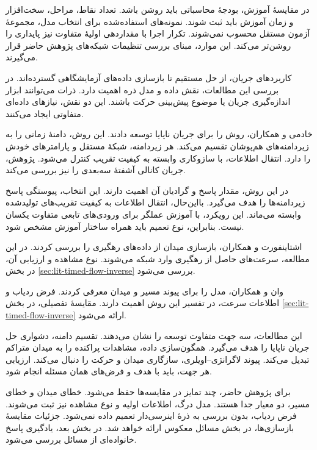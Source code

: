 در مقایسهٔ آموزش، بودجهٔ محاسباتی باید روشن باشد.
تعداد نقاط، مراحل، سخت‌افزار و زمان آموزش باید ثبت شوند.
نمونه‌های استفاده‌شده برای انتخاب مدل، مجموعهٔ آزمون مستقل محسوب نمی‌شوند.
تکرار اجرا با مقداردهی اولیهٔ متفاوت نیز پایداری را روشن‌تر می‌کند.
این موارد، مبنای بررسی تنظیمات شبکه‌های پژوهش حاضر قرار می‌گیرند.

\label{sec:lit-pinn-flow-particle-applications}

کاربردهای جریان، از حل مستقیم تا بازسازی داده‌های آزمایشگاهی گسترده‌اند.
در بررسی این مطالعات، نقش داده و مدل ذره اهمیت دارد.
ذرات می‌توانند ابزار اندازه‌گیری جریان یا موضوع پیش‌بینی حرکت باشند.
این دو نقش، نیازهای داده‌ای متفاوتی ایجاد می‌کنند.

خادمی و همکاران، روش  را برای جریان ناپایا توسعه دادند.
این روش، دامنهٔ زمانی را به زیردامنه‌های هم‌پوشان تقسیم می‌کند.
هر زیردامنه، شبکهٔ مستقل و پارامترهای خودش را دارد.
انتقال اطلاعات، با سازوکاری وابسته به کیفیت تقریب کنترل می‌شود.
پژوهش، جریان کانالی آشفتهٔ سه‌بعدی را نیز بررسی می‌کند.
\cite{Khademi2025}

در این روش، مقدار پاسخ و گرادیان آن اهمیت دارند.
این انتخاب، پیوستگی پاسخ زیردامنه‌ها را هدف می‌گیرد.
بااین‌حال، انتقال اطلاعات به کیفیت تقریب‌های تولیدشده وابسته می‌ماند.
این رویکرد، با آموزش عملگر برای ورودی‌های تابعی متفاوت یکسان نیست.
بنابراین، نوع تعمیم باید همراه ساختار آموزش مشخص شود.
\cite{Khademi2025}

اشتاینفورت و همکاران، بازسازی میدان از داده‌های رهگیری را بررسی کردند.
در این مطالعه، سرعت‌های حاصل از رهگیری وارد شبکه می‌شوند.
نوع مشاهده و ارزیابی آن، در بخش \ref{sec:lit-timed-flow-inverse} بررسی می‌شود.
\cite{Steinfurth2024}

وان و همکاران، مدل  را برای پیوند مسیر و میدان معرفی کردند.
فرض ردیاب و اطلاعات سرعت، در تفسیر این روش اهمیت دارند.
مقایسهٔ تفصیلی، در بخش \ref{sec:lit-timed-flow-inverse} ارائه می‌شود.
\cite{Wan2026TrajectoryFlowNet}

این مطالعات، سه جهت متفاوت توسعه را نشان می‌دهند.
تقسیم دامنه، دشواری حل جریان ناپایا را هدف می‌گیرد.
همگون‌سازی داده، مشاهدات پراکنده را به میدان متراکم تبدیل می‌کند.
پیوند لاگرانژی–اویلری، سازگاری میدان و حرکت را دنبال می‌کند.
ارزیابی هر جهت، باید با هدف و فرض‌های همان مسئله انجام شود.

برای پژوهش حاضر، چند تمایز در مقایسه‌ها حفظ می‌شود.
خطای میدان و خطای مسیر، دو معیار جدا هستند.
مدل درگ، اطلاعات اولیه و نوع مشاهده نیز ثبت می‌شوند.
فرض ردیاب، بدون بررسی به ذرهٔ اینرسی‌دار تعمیم داده نمی‌شود.
جزئیات مقایسهٔ بازسازی‌ها، در بخش مسائل معکوس ارائه خواهد شد.
در بخش بعد، یادگیری پاسخ خانواده‌ای از مسائل بررسی می‌شود.

